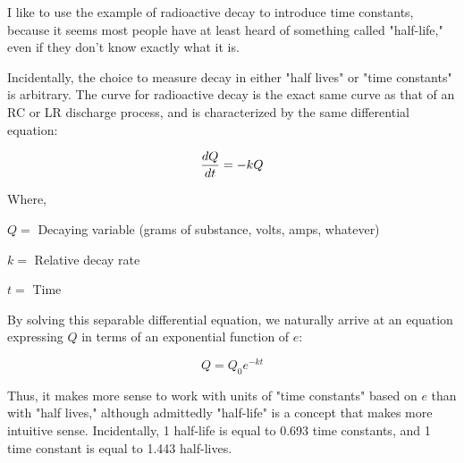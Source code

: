 
I like to use the example of radioactive decay to introduce time constants, because it seems most people have at least heard of something called "half-life," even if they don't know exactly what it is.

Incidentally, the choice to measure decay in either "half lives" or "time constants" is arbitrary.  The curve for radioactive decay is the exact same curve as that of an RC or LR discharge process, and is characterized by the same differential equation:

$${dQ \over dt} = -kQ$$

\noindent
Where,

$Q =$ Decaying variable (grams of substance, volts, amps, whatever)

$k =$ Relative decay rate

$t =$ Time

\vskip 10pt

By solving this separable differential equation, we naturally arrive at an equation expressing $Q$ in terms of an exponential function of $e$:

$$Q = Q_0 e^{-kt}$$

Thus, it makes more sense to work with units of "time constants" based on $e$ than with "half lives," although admittedly "half-life" is a concept that makes more intuitive sense.  Incidentally, 1 half-life is equal to 0.693 time constants, and 1 time constant is equal to 1.443 half-lives.




